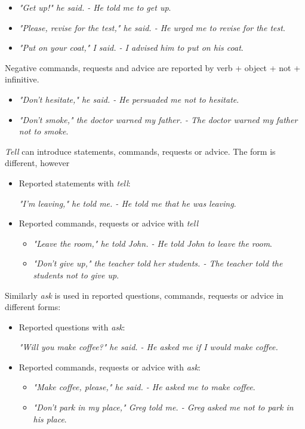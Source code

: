 \begin{itemize}

\item \textit{"Get up!" he said. - He told me to get up}.
\item \textit{"Please, revise for the test," he said. - He urged me to revise for the test}.
\item \textit{"Put on your coat," I said. - I advised him to put on his coat}.
\end{itemize}

Negative commands, requests and advice are reported by verb + object + not + infinitive.

\begin{itemize}

\item \textit{"Don't hesitate," he said. - He persuaded me not to hesitate}.
\item \textit{"Don't smoke," the doctor warned my father. - The doctor warned my father not to smoke}.
\end{itemize}

\textit{Tell} can introduce statements, commands, requests or advice. The form is different, however

\begin{itemize}

\item Reported statements with \textit{tell}:

\textit{"I'm leaving," he told me. - He told me that he was leaving}.

\item Reported commands, requests or advice with \textit{tell} 

\begin{itemize}
\item \textit{"Leave the room," he told John. - He told John to leave the room}.
\item \textit{"Don't give up," the teacher told her students. - The teacher told the students not to give up}.
\end{itemize}

\end{itemize}

Similarly \textit{ask} is used in reported questions, commands, requests or advice in different forms:

\begin{itemize}

\item Reported questions with \textit{ask}:

\textit{"Will you make coffee?" he said. - He asked me if I would make coffee.}

\item Reported commands, requests or advice with \textit{ask}:

\begin{itemize}
\item \textit{"Make coffee, please," he said. - He asked me to make coffee}. 
\item \textit{"Don't park in my place," Greg told me. - Greg asked me not to park in his place}.
\end{itemize}

\end{itemize}


